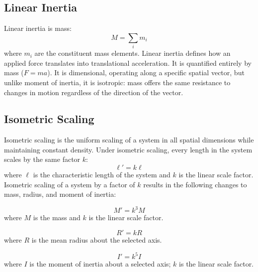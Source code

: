 \subsection{Linear Inertia}
Linear inertia is mass:
\begin{equation} \label{eq:mass}
M = \sum_i m_i
\end{equation}
where $m_i$ are the constituent mass elements. Linear inertia defines how an applied force translates into translational acceleration. It is quantified entirely by mass ($F = ma$). It is dimensional, operating along a specific spatial vector, but unlike moment of inertia, it is isotropic: mass offers the same resistance to changes in motion regardless of the direction of the vector.

\subsection{Isometric Scaling}
Isometric scaling is the uniform scaling of a system in all spatial dimensions while maintaining constant density. Under isometric scaling, every length in the system scales by the same factor $k$:
\begin{equation} \label{eq:length_scaling}
\ell' = k\ell
\end{equation}
where $\ell$ is the characteristic length of the system and $k$ is the linear scale factor. Isometric scaling of a system by a factor of $k$ results in the following changes to mass, radius, and moment of inertia:

\begin{equation} \label{eq:mass_scaling}
M' = k^3 M
\end{equation}
where $M$ is the mass and $k$ is the linear scale factor.

\begin{equation} \label{eq:radius_scaling}
R' = kR
\end{equation}
where $R$ is the mean radius about the selected axis.

\begin{equation} \label{eq:inertia_scaling}
I' = k^5 I
\end{equation}
where $I$ is the moment of inertia about a selected axis; $k$ is the linear scale factor.

